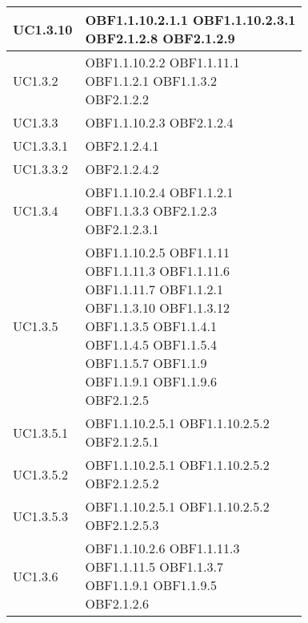 \documentclass{scalatekids-article}
\begin{document}
\begin{longtable}[H]{|p{5.5cm}|p{5.5cm}|}
  \hline
  UC1.3.10 & \multiLineCell[t]{OBF1.1.10.2.1.1 OBF1.1.10.2.3.1\\OBF2.1.2.8 OBF2.1.2.9\\}\\
  \hline
  UC1.3.2 & \multiLineCell[t]{OBF1.1.10.2.2 OBF1.1.11.1\\OBF1.1.2.1 OBF1.1.3.2\\OBF2.1.2.2\\}\\
  \hline
  UC1.3.3 & \multiLineCell[t]{OBF1.1.10.2.3 OBF2.1.2.4\\}\\
  \hline
  UC1.3.3.1 & \multiLineCell[t]{OBF2.1.2.4.1\\}\\
  \hline
  UC1.3.3.2 & \multiLineCell[t]{OBF2.1.2.4.2\\}\\
  \hline
  UC1.3.4 & \multiLineCell[t]{OBF1.1.10.2.4 OBF1.1.2.1\\OBF1.1.3.3 OBF2.1.2.3\\OBF2.1.2.3.1\\}\\
  \hline
  UC1.3.5 & \multiLineCell[t]{OBF1.1.10.2.5 OBF1.1.11\\OBF1.1.11.3 OBF1.1.11.6\\OBF1.1.11.7 OBF1.1.2.1\\OBF1.1.3.10 OBF1.1.3.12\\OBF1.1.3.5 OBF1.1.4.1\\OBF1.1.4.5 OBF1.1.5.4\\OBF1.1.5.7 OBF1.1.9\\OBF1.1.9.1 OBF1.1.9.6\\OBF2.1.2.5\\}\\
  \hline
  UC1.3.5.1 & \multiLineCell[t]{OBF1.1.10.2.5.1 OBF1.1.10.2.5.2\\OBF2.1.2.5.1\\}\\
  \hline
  UC1.3.5.2 & \multiLineCell[t]{OBF1.1.10.2.5.1 OBF1.1.10.2.5.2\\OBF2.1.2.5.2\\}\\
  \hline
  UC1.3.5.3 & \multiLineCell[t]{OBF1.1.10.2.5.1 OBF1.1.10.2.5.2\\OBF2.1.2.5.3\\}\\
  \hline
  UC1.3.6 & \multiLineCell[t]{OBF1.1.10.2.6 OBF1.1.11.3\\OBF1.1.11.5 OBF1.1.3.7\\OBF1.1.9.1 OBF1.1.9.5\\OBF2.1.2.6\\}\\

\end{longtable}
\end{document}
